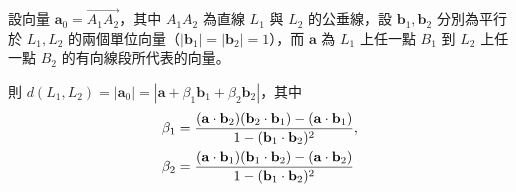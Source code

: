 \begin{prop}
\label{prop:b3-5-3}
設向量 $\mathbf{a}_0 = \vec{A_1A_2}$，其中 $A_1A_2$ 為直線 $L_1$ 與 $L_2$ 的公垂線，設 $\mathbf{b}_1, \mathbf{b}_2$ 分別為平行於 $L_1, L_2$ 的兩個單位向量（$|\mathbf{b}_1| = |\mathbf{b}_2| = 1$），而 $\mathbf{a}$ 為 $L_1$ 上任一點 $B_1$ 到 $L_2$ 上任一點 $B_2$ 的有向線段所代表的向量。

則 $d(L_1, L_2) = |\mathbf{a}_0| = |\mathbf{a} + \beta_1 \mathbf{b}_1 + \beta_2 \mathbf{b}_2|$，其中
\begin{align}
\beta_1 &= \frac{(\mathbf{a} \cdot \mathbf{b}_2)(\mathbf{b}_2 \cdot \mathbf{b}_1) - (\mathbf{a} \cdot \mathbf{b}_1)}{1 - (\mathbf{b}_1 \cdot \mathbf{b}_2)^2}, \notag \\
\beta_2 &= \frac{(\mathbf{a} \cdot \mathbf{b}_1)(\mathbf{b}_1 \cdot \mathbf{b}_2) - (\mathbf{a} \cdot \mathbf{b}_2)}{1 - (\mathbf{b}_1 \cdot \mathbf{b}_2)^2} \label{eq:b3-5-7}
\end{align}
\end{prop}

